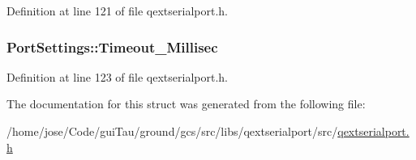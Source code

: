 Definition at line 121 of file qextserialport.\-h.

\hypertarget{struct_port_settings_a7147addae7fce6e8e4b302014967a0db}{
\subsubsection[{Timeout\-\_\-\-Millisec}]{ Port\-Settings\-::\-Timeout\-\_\-\-Millisec}}\label{struct_port_settings_a7147addae7fce6e8e4b302014967a0db}


Definition at line 123 of file qextserialport.\-h.



The documentation for this struct was generated from the following file\-:\begin{DoxyCompactItemize}
\item 
/home/jose/\-Code/gui\-Tau/ground/gcs/src/libs/qextserialport/src/\hyperlink{qextserialport_8h}{qextserialport.\-h}\end{DoxyCompactItemize}
